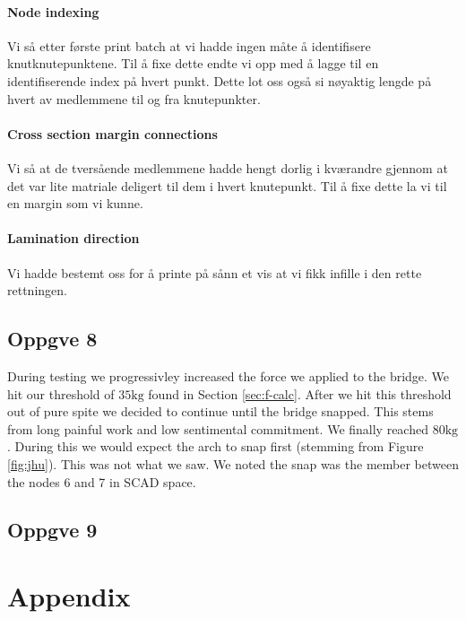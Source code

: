 \documentclass{report}
\begin{document}
\subsubsection {Node indexing}

Vi så etter første print batch at vi hadde ingen måte å identifisere knutknutepunktene. Til å fixe dette endte vi opp med å lagge til en identifiserende index på hvert punkt. Dette lot oss også si nøyaktig lengde på hvert av medlemmene til og fra knutepunkter.

\subsubsection {Cross section margin connections}

Vi så at de tversående medlemmene hadde hengt dorlig i kværandre gjennom at det var lite matriale deligert til dem i hvert knutepunkt. Til å fixe dette la vi til en margin som vi kunne.

\subsubsection {Lamination direction}

Vi hadde bestemt oss for å printe på sånn et vis at vi fikk infille i den rette rettningen.

\section{Oppgve 8}

During testing we progressivley increased the force we applied to the bridge. We hit our threshold of $35\mathrm{kg}$ found in Section \ref{sec:f-calc}. After we hit this threshold out of pure spite we decided to continue until the bridge snapped. This stems from long painful work and low sentimental commitment. We finally reached $80\mathrm{kg}$. During this we would expect the arch to snap first (stemming from Figure \ref{fig:jhu}). This was not what we saw. We noted the snap was the member between the nodes 6 and 7 in SCAD space.

\section{Oppgve 9}

\chapter{Appendix}
\end{document}
